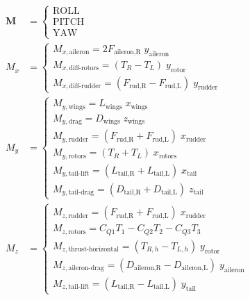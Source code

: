 \documentclass[12pt]{article}
\begin{document}
\[
\begin{aligned}
\mathbf{M} &= 
\left\{
\begin{array}{l}
\text{ROLL} \\[4pt]
\text{PITCH} \\[4pt]
\text{YAW}
\end{array}
\right. \\[16pt]
%
M_x &= 
\left\{
\begin{array}{l}
M_{x,\text{aileron}}
= 2F_{\text{aileron,R}}\; y_{\text{aileron}}
\\[6pt]
M_{x,\text{diff-rotors}}
= (T_R - T_L)\; y_{\text{rotor}}
\\[6pt]
M_{x,\text{diff-rudder}}
= (F_{\text{rud,R}} - F_{\text{rud,L}})\; y_{\text{rudder}}
\end{array}
\right.
\\[20pt]
%
M_y &= 
\left\{
\begin{array}{l}
M_{y,\text{wings}}
= L_{\text{wings}}\; x_{\text{wings}}
\\[6pt]
M_{y,\text{drag}} 
= D_{\text{wings}}\; z_{\text{wings}}
\\[6pt]
M_{y,\text{rudder}}
= (F_{\text{rud,R}} + F_{\text{rud,L}})\; x_{\text{rudder}}
\\[6pt]
M_{y,\text{rotors}}
= (T_R + T_L)\; x_{\text{rotors}}
\\[6pt]
M_{y,\text{tail-lift}}
= (L_{\text{tail,R}} + L_{\text{tail,L}})\; x_{\text{tail}}
\\[6pt]
M_{y,\text{tail-drag}}
= (D_{\text{tail,R}} + D_{\text{tail,L}})\; z_{\text{tail}}
\end{array}
\right.
\\[20pt]
%
M_z &= 
\left\{
\begin{array}{l}
M_{z,\text{rudder}}
= (F_{\text{rud,R}} + F_{\text{rud,L}})\; x_{\text{rudder}}
\\[6pt]
M_{z,\text{rotors}}
= C_{Q1}T_1 - C_{Q2}T_2 - C_{Q3}T_3
\\[6pt]
M_{z,\text{thrust-horizontal}}
= (T_{R,h} - T_{L,h})\; y_{\text{rotor}}
\\[6pt]
M_{z,\text{aileron-drag}}
= (D_{\text{aileron,R}} - D_{\text{aileron,L}})\; y_{\text{aileron}}
\\[6pt]
M_{z,\text{tail-lift}}
= (L_{\text{tail,R}} - L_{\text{tail,L}})\; y_{\text{tail}}
\end{array}
\right.
\end{aligned}
\]
\end{document}
